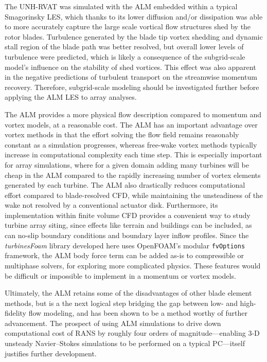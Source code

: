 The UNH-RVAT was simulated with the ALM embedded within a typical Smagorinsky
LES, which thanks to its lower diffusion and/or dissipation was able to more
accurately capture the large scale vortical flow structures shed by the rotor
blades. Turbulence generated by the blade tip vortex shedding and dynamic stall
region of the blade path was better resolved, but overall lower levels of
turbulence were predicted, which is likely a consequence of the subgrid-scale
model's influence on the stability of shed vortices. This effect was also
apparent in the negative predictions of turbulent transport on the streamwise
momentum recovery. Therefore, subgrid-scale modeling should be investigated
further before applying the ALM LES to array analyses.

The ALM provides a more physical flow description compared to momentum and
vortex models, at a reasonable cost. The ALM has an important advantage over
vortex methods in that the effort solving the flow field remains reasonably
constant as a simulation progresses, whereas free-wake vortex methods typically
increase in computational complexity each time step. This is especially
important for array simulations, where for a given domain adding many turbines
will be cheap in the ALM compared to the rapidly increasing number of vortex
elements generated by each turbine. The ALM also drastically reduces
computational effort compared to blade-resolved CFD, while maintaining the
unsteadiness of the wake not resolved by a conventional actuator disk.
Furthermore, its implementation within finite volume CFD provides a convenient
way to study turbine array siting, since effects like terrain and buildings can
be included, as can no-slip boundary conditions and boundary layer inflow
profiles. Since the \textit{turbinesFoam} library developed here uses OpenFOAM's
modular \texttt{fvOptions} framework, the ALM body force term can be added as-is
to compressible or multiphase solvers, for exploring more complicated physics.
These features would be difficult or impossible to implement in a momentum or
vortex models.

Ultimately, the ALM retains some of the disadvantages of other blade element
methods, but is a the next logical step bridging the gap between low- and
high-fidelity flow modeling, and has been shown to be a method worthy of further
advancement. The prospect of using ALM simulations to drive down computational
cost of RANS by roughly four orders of magnitude---enabling 3-D unsteady
Navier--Stokes simulations to be performed on a typical PC---itself justifies
further development.

